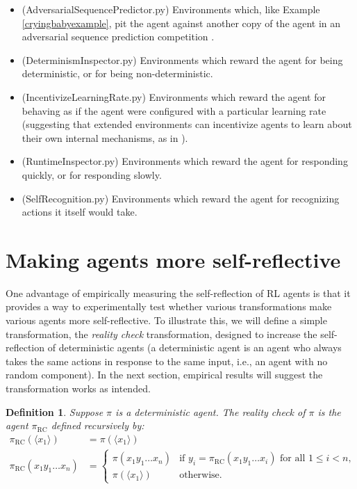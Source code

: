 \documentclass{article}
\newtheorem{definition}[mytheorem]{Definition}
\def\RC{\textrm{RC}}
\begin{document}
\begin{itemize}
  \item
  (AdversarialSequencePredictor.py) Environments which, like Example \ref{cryingbabyexample}, pit the agent against
  another copy of the agent in an adversarial sequence prediction competition
  \cite{hibbard2008adversarial}.
  \item
  (DeterminismInspector.py) Environments which reward the agent for being deterministic,
  or for being non-deterministic.
  \item
  (IncentivizeLearningRate.py) Environments which reward the agent for behaving as if
  the agent were configured with a particular learning rate (suggesting that extended
  environments can incentivize agents to learn about their own internal mechanisms,
  as in \cite{sherstan2016introspective}).
  \item
  (RuntimeInspector.py) Environments which reward the agent for responding quickly,
  or for responding slowly.
  \item
  (SelfRecognition.py) Environments which reward the agent for recognizing actions it itself
  would take.
\end{itemize}

\section{Making agents more self-reflective}
\label{realitychecksection}

One advantage of empirically measuring the self-reflection of RL agents is that it
provides a way to experimentally test whether various transformations make various
agents more self-reflective. To illustrate this, we will define a simple transformation,
the \emph{reality check} transformation, designed to increase the self-reflection
of deterministic agents (a deterministic agent is an agent who always takes the same
actions in response to the same input, i.e., an agent with no random component).
In the next section, empirical results will suggest the transformation works as intended.

\begin{definition}
\label{realitycheckdefn}
  Suppose $\pi$ is a deterministic agent. The \emph{reality check} of $\pi$ is the agent
  $\pi_{\RC}$ defined recursively by:
  \begin{align*}
    \pi_{\RC}(\langle x_1\rangle) &= \pi(\langle x_1\rangle)\\
    \pi_{\RC}(x_1y_1\ldots x_n) &=
    \begin{cases}
      \pi(x_1y_1\ldots x_n) & \mbox{if $y_i=\pi_{\RC}(x_1y_1\ldots x_i)$ for all $1\leq i<n$,}\\
      \pi(\langle x_1\rangle) & \mbox{otherwise.}
    \end{cases}
  \end{align*}
\end{definition}
\end{document}
